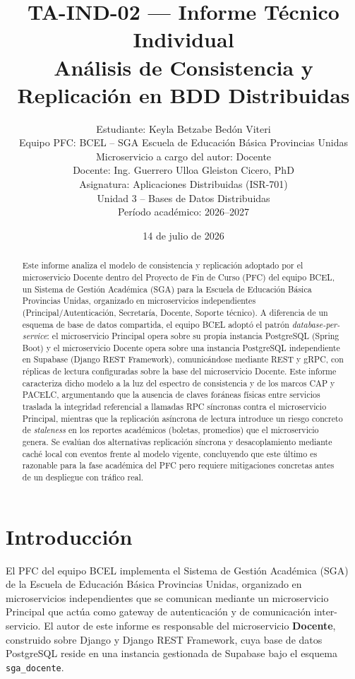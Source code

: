 \documentclass[11pt,a4paper]{article}
\title{\textbf{TA-IND-02 --- Informe Técnico Individual}\\
\large Análisis de Consistencia y Replicación en BDD Distribuidas}
\author{
Estudiante: Keyla Betzabe Bedón Viteri \\
Equipo PFC: BCEL -- SGA Escuela de Educación Básica Provincias Unidas \\
Microservicio a cargo del autor: Docente \\
Docente: Ing. Guerrero Ulloa Gleiston Cicero, PhD \\
Asignatura: Aplicaciones Distribuidas (ISR-701) \\
Unidad 3 -- Bases de Datos Distribuidas \\
Período académico: 2026--2027
}
\date{14 de julio de 2026}
\begin{document}
\maketitle

\begin{abstract}
\noindent
Este informe analiza el modelo de consistencia y replicación adoptado por el microservicio Docente dentro del Proyecto de Fin de Curso (PFC) del equipo BCEL, un Sistema de Gestión Académica (SGA) para la Escuela de Educación Básica Provincias Unidas, organizado en microservicios independientes (Principal/Autenticación, Secretaría, Docente, Soporte técnico).
A diferencia de un esquema de base de datos compartida, el equipo BCEL adoptó el patrón \emph{database-per-service}: el microservicio Principal opera sobre su propia instancia PostgreSQL (Spring Boot) y el microservicio Docente opera sobre una instancia PostgreSQL independiente en Supabase (Django REST Framework), comunicándose mediante REST y gRPC, con réplicas de lectura configuradas sobre la base del microservicio Docente. Este informe caracteriza dicho modelo a la luz del espectro de consistencia y de los marcos CAP y PACELC, argumentando que la ausencia de claves foráneas físicas entre servicios traslada la integridad referencial a llamadas RPC síncronas contra el microservicio Principal, mientras que la replicación asíncrona de lectura introduce un riesgo concreto de \emph{staleness} en los reportes académicos (boletas, promedios) que el microservicio genera. Se evalúan dos alternativas replicación síncrona y desacoplamiento mediante caché local con eventos frente al modelo vigente, concluyendo que este último es razonable para la fase académica del PFC pero requiere mitigaciones concretas antes de un despliegue con tráfico real.
\end{abstract}

\section{Introducción}

El PFC del equipo BCEL implementa el Sistema de Gestión Académica (SGA) de la Escuela de Educación Básica Provincias Unidas, organizado en microservicios independientes que se comunican mediante un microservicio Principal que actúa como gateway de autenticación y de comunicación inter-servicio. El autor de este informe es responsable del microservicio
\textbf{Docente}, construido sobre Django y Django REST Framework, cuya base de datos PostgreSQL reside en una instancia gestionada de Supabase bajo el esquema \texttt{sga\_docente}.
\end{document}
